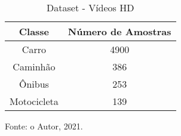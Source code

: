 \begin{table}[H]
\centering
\caption{Dataset - Vídeos HD}
\label{tab:daer_hd_videos}
{%
\begin{tabular}{cc}
\hline
\textbf{Classe} & \textbf{Número de Amostras} \\ \hline
Carro           & 4900                        \\
Caminhão        & 386                         \\
Ônibus          & 253                         \\
Motocicleta     & 139                         \\ \hline
\end{tabular}%

Fonte: o Autor, 2021.
}
\end{table}